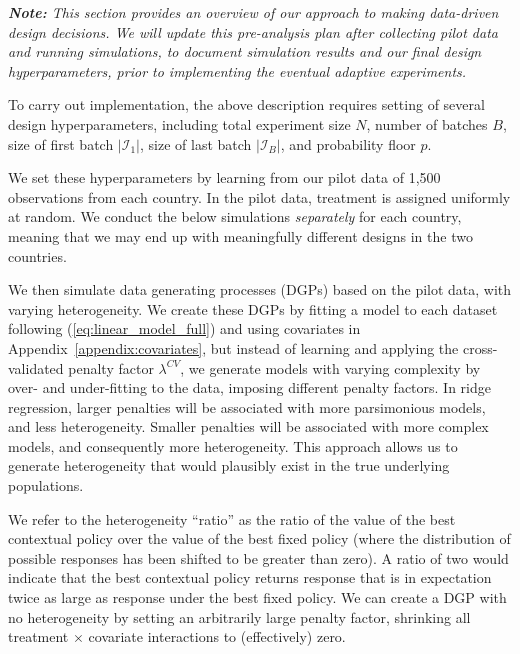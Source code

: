 \documentclass[letterpaper, 12pt, parskip=full,DIV=10]{scrartcl}
\begin{document}
\textit{\textbf{Note:} This section provides an overview of our approach to making data-driven design decisions. We will update this pre-analysis plan \textit{after} collecting pilot data and running simulations, to document simulation results and our final design hyperparameters, prior to implementing the eventual adaptive experiments. }

To carry out implementation, the above description requires setting of several design hyperparameters, including total experiment size $N$, number of batches $B$,  size of first batch $|\mathcal{I}_1|$, size of last batch $|\mathcal{I}_B|$, and probability floor $p$. 

We set these hyperparameters by learning from our pilot data of 1,500 observations from each country. In the pilot data, treatment is assigned uniformly at random. We conduct the below simulations \textit{separately} for each country, meaning that we may end up with meaningfully different designs in the two countries. 

We then simulate data generating processes (DGPs) based on the pilot data, with varying heterogeneity. We create these DGPs by fitting a model to each dataset following (\ref{eq:linear_model_full}) and using covariates in Appendix~\ref{appendix:covariates}, but instead of learning and applying the cross-validated penalty factor $\lambda^{CV}$, we generate models with varying complexity by over- and under-fitting to the data, imposing different penalty factors. In ridge regression, larger penalties will be associated with more parsimonious models, and less heterogeneity. Smaller penalties will be associated with more complex models, and consequently more heterogeneity. This approach allows us to generate heterogeneity that would plausibly exist in the true underlying populations. 

We refer to the heterogeneity ``ratio'' as the ratio of the value of the best contextual policy over the value of the best fixed policy (where the distribution of possible responses has been shifted to be greater than zero). A ratio of two would indicate that the best contextual policy returns response that is in expectation twice as large as response under the best fixed policy. We can create a DGP with no heterogeneity by setting an arbitrarily large penalty factor, shrinking all treatment $\times$ covariate interactions to (effectively) zero. 
\end{document}
